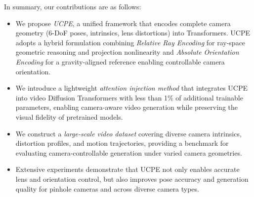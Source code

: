 In summary, our contributions are as follows:
\begin{itemize}
    \item We propose \emph{UCPE}, a unified framework that encodes complete camera geometry (6-DoF poses, intrinsics, lens distortions) into Transformers. UCPE adopts a hybrid formulation combining \emph{Relative Ray Encoding} for ray-space geometric reasoning and projection nonlinearity and \emph{Absolute Orientation Encoding} for a gravity-aligned reference enabling controllable camera orientation.
    \item We introduce a lightweight \emph{attention injection method} that integrates UCPE into video Diffusion Transformers with less than 1\% of additional trainable parameters, enabling camera-aware video generation while preserving the visual fidelity of pretrained models.
    \item We construct a \emph{large-scale video dataset} covering diverse camera intrinsics, distortion profiles, and motion trajectories, providing a benchmark for evaluating camera-controllable generation under varied camera geometries.
    \item Extensive experiments demonstrate that UCPE not only enables accurate lens and orientation control, but also improves pose accuracy and generation quality for pinhole cameras and across diverse camera types.
\end{itemize}
